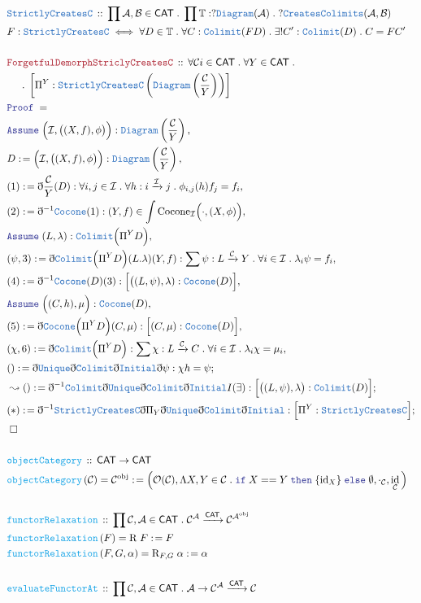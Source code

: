 \documentclass[12pt]{scrartcl}
\newcommand{\TYPE}[1]{\textcolor{NavyBlue}{\mathtt{#1}}}
\newcommand{\FUNC}[1]{\textcolor{Cerulean}{\mathtt{#1}}}
\newcommand{\LOGIC}[1]{\textcolor{Blue}{\mathtt{#1}}}
\newcommand{\THM}[1]{\textcolor{Maroon}{\mathtt{#1}}}
\renewcommand{\.}{\; . \;}
\newcommand{\de}{: \kern 0.1pc =}
\newcommand{\If}{\LOGIC{if} \;}
\newcommand{\Then}{ \; \LOGIC{then} \;}
\newcommand{\Else}{\; \LOGIC{else} \;}
\newcommand{\Act}[1]{\left( #1 \right)}
\newcommand{\Theorem}[2]{& \THM{#1} \, :: \, #2 \\ & \Proof = \\ }
\newcommand{\DeclareType}[2]{& \TYPE{#1} \, :: \, #2 \\}
\newcommand{\DefineType}[3]{& #1 : \TYPE{#2} \iff #3 \\}
\newcommand{\DeclareFunc}[2]{& \FUNC{#1} \, :: \, #2 \\}
\newcommand{\DefineNamedFunc}[4]{&  \FUNC{#1}\Act{#2} = #3 \de #4 \\}
\newcommand{\NewLine}{\\ & \kern 1pc}
\newcommand{\Page}[1]{ \begin{align*} #1 \end{align*}   }
\newcommand{ \bd }{ \ByDef }
\DeclareMathOperator*{\id}{id}
\newcommand{\Obj}{\mathcal{O}}
\newcommand{\Arrow}{\xrightarrow}
\newcommand{\Say}[3]{& #1 \de #2 : #3, \\}
\newcommand{\Conclude}[3]{& #1 \de #2 : #3; \\}
\newcommand{\DeriveConclude}[3]{& \leadsto #1 \de #2 : #3 ; \\}
\newcommand{\Assume}[2]{& \LOGIC{Assume} \; #1 : #2, \\}
\newcommand{\QED}{\; \square}
\newcommand{\EndProof}{& \QED \\}
\newcommand{\ByDef}{\eth}
\newcommand{\Proof}{\LOGIC{Proof} \; }
\newcommand{\obj}{\mathrm{obj}}
\newcommand{\C}{\mathcal{C}}
\newcommand{\A}{\mathcal{A}}
\newcommand{\B}{\mathcal{B}}
\newcommand{\I}{\mathcal{I}}
\newcommand{\CAT}{\mathsf{CAT}}
\begin{document}
\Page{
	\DeclareType{StrictlyCreatesC}{\prod \A,\B \in \CAT \. \prod \mathbb{T} : ?\TYPE{Diagram}(\A) \.  
		?\TYPE{CreatesColimits}(\A,\B)}
	\DefineType{F}{StrictlyCreatesC}{ \forall D \in \mathbb{T} \. \forall  C : \TYPE{Colimit}(FD) \. 
		\exists! C' : \TYPE{Colimit}(D) \. C = FC'    }
	\\	
	\Theorem{ForgetfulDemorphStriclyCreatesC}{ 
		\forall \C i\in \CAT \. 
		\forall Y \in \CAT \. \NewLine \.
		\left[ \Pi^Y : \TYPE{StrictlyCreatesC}\left(\TYPE{Diagram}\left( \frac{\C}{Y} \right)\right) \right]
	}
	\Assume{\Big( \I,\big( (X,f),\phi\big)\Big)}{\TYPE{Diagram}\left( \frac{\C}{Y} \right)}
	\Say{D}{\Big(\I,\big((X,f),\phi\big)\Big)}{\TYPE{Diagram}\left( \frac{\C}{Y} \right)}
	\Say{(1)}{\bd \frac{\C}{Y}(D)}{ \forall i,j \in \I \. \forall h : i \Arrow{\I} j \. \phi_{i,j}(h)f_j = f_i }
	\Say{(2)}{\bd^{-1} \TYPE{Cocone} (1) }{ (Y,f) \in \int \mathrm{Cocone}_\I\Big(\cdot,(X,\phi)\Big)   }
	\Assume{(L,\lambda)}{\TYPE{Colimit}\Big( \Pi^Y D \Big)}
	\Say{(\psi,3)}{\bd \TYPE{Colimit}\Big(\Pi^Y D\Big)(L.\lambda)(Y,f)}{
		\sum \psi : L \Arrow{\C} Y \. \forall i \in \I \.  \lambda_i \psi = f_i }
	\Say{(4)}{\bd^{-1} \TYPE{Cocone}(D)(3)}{\Big[ \big((L,\psi),\lambda) : \TYPE{Cocone}(D) \Big]}
	\Assume{\Big( (C,h),\mu \Big)}{ \TYPE{Cocone}(D) }
	\Say{(5)}{ \bd \TYPE{Cocone}\Big( \Pi^Y D \Big)(C,\mu) }{ \Big[ (C,\mu) : \TYPE{Cocone}(D) \Big]  }
	\Say{(\chi,6)}{  \bd \TYPE{Colimit}\Big( \Pi^Y D \Big) }{  \sum \chi : L \Arrow{\C} C \.
		\forall i \in \I \.  \lambda_i \chi = \mu_i  }
	\Conclude{()}{\bd \TYPE{Unique} \bd \TYPE{Colimit} \bd \TYPE{Initial} \bd \psi }{ \chi h = \psi  }
	\DeriveConclude{()}{ \bd^{-1} \TYPE{Colimit} \bd \TYPE{Unique} \bd \TYPE{Colimit} \bd \TYPE{Initial} I(\exists) }
	{ \Big[  \big( (L,\psi), \lambda \big) : \TYPE{Colimit}(D) \Big]     }
	\Conclude{(*)}{\bd^{-1} \TYPE{StrictlyCreatesC} \bd \Pi_Y \bd \TYPE{Unique} \bd \TYPE{Colimit} \bd \TYPE{Initial}}
	{\Big[ \Pi^Y : \TYPE{StrictlyCreatesC} \Big]}
	\EndProof
	\\
	\DeclareFunc{objectCategory}{\CAT \to \CAT}
	\DefineNamedFunc{objectCategory}{\C}{\C^\obj}{\Big( \Obj(\C), \Lambda X,Y \in \C \. \If X == Y \Then \{{\id}_X\} 
		\Else \emptyset , \cdot_\C, \id_\C \Big)}
	\\
	\DeclareFunc{functorRelaxation}{\prod \C,\A \in \CAT \. \C^\A \Arrow{\CAT} \C^{\A^\obj}}
	\DefineNamedFunc{functorRelaxation}{F}{\mathrm{R} \; F}{F}
	\DefineNamedFunc{functorRelaxation}{F,G,\alpha}{\mathrm{R}_{F,G} \; \alpha }{\alpha }
	\\
	\DeclareFunc{evaluateFunctorAt}{\prod \C,\A \in \CAT \. \A \to  \C^\A \Arrow{\CAT} \C}
}
\end{document}

